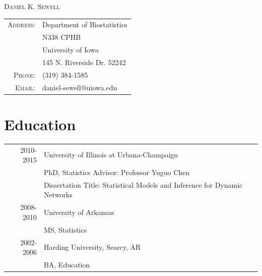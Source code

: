 \documentclass[11pt]{article}
\begin{document}
\nocite{medgyesi2018where}
\nocite{Metcalf2018}
\nocite{sewell2018simultaneous}
\nocite{sewell2018visualizing}
\nocite{anthony2017seasonal}
\nocite{bernhard2017clustering}
\nocite{dow2017teamwork}
\nocite{peterson2017warmer}
\nocite{sewell2017heterogeneity}
\nocite{sewell2017network}
\nocite{sewell2017latent}
\nocite{simmering2017legionnaires}
\nocite{sewell2016weighted}
\nocite{sewell2016model}
\nocite{sewell2015analysis}
\nocite{sewell2015latent}
\nocite{sewell2015parameter}


\begin{center}
\Huge
\textsc{Daniel K. Sewell}
\normalsize
\end{center}
\begin{tabular}{rl}
\textsc{Address:}&Department of Biostatistics \\
&N338 CPHB\\
&University of Iowa\\
&145 N. Riverside Dr. 52242\\
\textsc{Phone:} &(319) 384-1585 \\
\textsc{Email:}&daniel-sewell@uiowa.edu
\end{tabular}

\vspace{1pc}
\section{Education}
\begin{tabular}{r|p{16cm}}
2010-2015 & University of Illinois at Urbana-Champaign\\
& PhD, Statistics \hspace{2pc} Advisor: Professor Yuguo Chen\\
& Dissertation Title: Statistical Models and Inference for Dynamic Networks \\
2008-2010 & University of Arkansas  \\
&MS, Statistics \\
2002-2006 & Harding University, Searcy, AR  \\
& BA, Education
\end{tabular}
\end{document}
